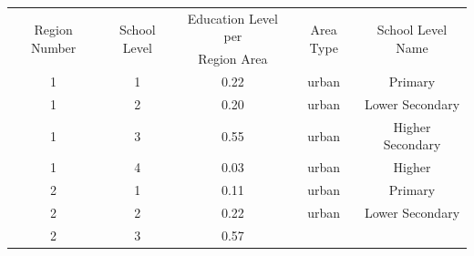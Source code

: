 \documentclass[stu, 12pt, floatsintext,longtable]{apa7}
\begin{document}
\begin{longtable}{ccccc}
    \toprule
    \multicolumn{1}{c}{\multirow{2}{*}{Region Number}} &
    \multicolumn{1}{c}{\multirow{2}{*}{School Level}}  &
    \multicolumn{1}{c}{Education Level per}            &
    \multicolumn{1}{c}{\multirow{2}{*}{Area Type}}     &
    \multicolumn{1}{c}{\multirow{2}{*}{School Level Name}}
    \\
    \multicolumn{1}{c}{}                               & \multicolumn{1}{c}{}
                                                       & Region Area          &
    \multicolumn{1}{c}{}                               & \multicolumn{1}{c}{}
    \\
    \midrule
    1                                                  & 1                    &
    0.22                                               &
    urban                                              & Primary
    \\
    1                                                  & 2                    &
    0.20                                               &
    urban                                              & Lower Secondary
    \\
    1                                                  & 3                    &
    0.55                                               &
    urban                                              & Higher Secondary
    \\
    1                                                  & 4                    &
    0.03                                               &
    urban                                              & Higher
    \\
    2                                                  & 1                    &
    0.11                                               &
    urban                                              & Primary
    \\
    2                                                  & 2                    &
    0.22                                               &
    urban                                              & Lower Secondary
    \\
    2                                                  & 3                    &
    0.57                                               &

\end{longtable}
\end{document}
